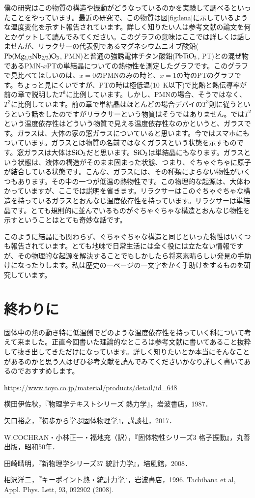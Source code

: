\documentclass[10pt,b5paper,papersize,dvipdfmx]{jsbook}
\begin{document}
僕の研究はこの物質の構造や振動がどうなっているのかを実験して調べるといったことをやっています。最近の研究で、この物質は図\ref{fig:lena}に示しているような温度変化を示すト報告されています。詳しく知りたい人は参考文献\cite{relaxCT}の論文を何とかゲットして読んでみてください。このグラフの意味はここでは詳しくは話しませんが、リラクサーの代表例であるマグネシウムニオブ酸鉛($\rm{Pb(Mg_{1/3}Nb_{2/3})O_3}$, PMN)と普通の強誘電体チタン酸鉛($\rm{PbTiO_3}$, PT)との混ぜ物であるPMN-$x$PTの単結晶についての熱物性を測定したグラフです。このグラフで見比べてほしいのは、$x = 0$のPMNのみの時と、$x = 1$の時のPTのグラフです。ちょっと見にくいですが、PTの時は極低温(10~K以下)で比熱と熱伝導率が前の章で説明した$T^3$に比例しています。しかし、PMNの場合、そうではなく、$T^2$に比例しています。前の章で単結晶はほとんどの場合デバイの$T^3$則に従うというという話をしたのですがリラクサーという物質はそうではありません。では$T^2$という温度依存性はどういう物質で見える温度依存性なのかというと、ガラスです。ガラスは、大体の家の窓ガラスについていると思います。今ではスマホにもついています。ガラスとは物質の名前ではなくガラスという状態を示すものです。窓ガラスは大体は$\rm{SiO}_2$だと思います。$\rm{SiO}_2$は単結晶にもなります。ガラスという状態は、液体の構造がそのまま固まった状態、つまり、ぐちゃぐちゃに原子が結合している状態です。こんな、ガラスには、その種類によらない物性がいくつもあります。その中の一つが低温の熱物性です。この物理的な起源は、大体わかっていますが、ここでは説明を省きます。リラクサーはこのぐちゃぐちゃな構造を持っているガラスとおんなじ温度依存性を持っています。リラクサーは単結晶です。とても規則的に並んでいるものがぐちゃぐちゃな構造とおんなじ物性を示すということはとても奇妙な話です。\par
このように結晶にも関わらず、ぐちゃぐちゃな構造と同じといった物性はいくつも報告されています。とても地味で日常生活には全く役には立たない情報ですが、その物理的な起源を解決することでもしかしたら将来素晴らしい発見の手助けになったりします。私は歴史の一ページの一文字をかく手助けをするものを研究しています。


\section{終わりに}
固体中の熱の動き特に低温側でどのような温度依存性を持っていく科について考えて来ました。正直今回書いた理論的なところは参考文献に書いてあること抜粋して抜き出してきただけになっています。詳しく知りたいとか本当にそんなことがあるのかと思う人はぜひ参考文献を読んでみてくださいかなり詳しく書いてあるのでおすすめします。
\begin{thebibliography}{99}
   \url{https://www.toyo.co.jp/material/products/detail/id=648}
  \item 横田伊佐秋，『物理学テキストシリーズ 熱力学』，岩波書店，1987．
  \item 矢口裕之，『初歩から学ぶ固体物理学』，講談社，2017．
  \item W.COCHRAN・小林正一・福地充（訳），『固体物性シリーズ3 格子振動』，丸善出版，昭和50年．
  \item 田崎晴明，『新物理学シリーズ37 統計力学』，培風館，2008．
  \item 相沢洋二，『キーポイント熱・統計力学』，岩波書店，1996.
  Tachibana et al, Appl. Phys. Lett, 93, 092902 (2008).
\end{thebibliography}
\end{document}
